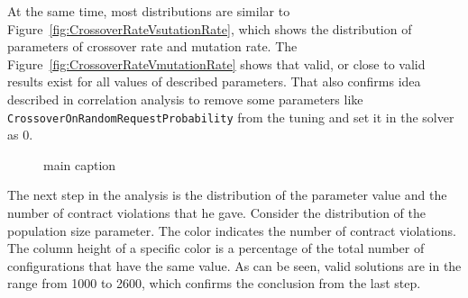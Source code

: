 At the same time, most distributions are similar to Figure~\ref{fig:CrossoverRateVsutationRate}, which shows the distribution of parameters of crossover rate and mutation rate. 
The Figure~\ref{fig:CrossoverRateVmutationRate} shows that valid, or close to valid results exist for all values of described parameters. That also confirms idea described in correlation analysis to remove some parameters like \texttt{CrossoverOnRandomRequestProbability} from the tuning and set it in the solver as 0.

\begin{figure}
	
	
	\caption{main caption}	
\end{figure}

The next step in the analysis is the distribution of the parameter value and the number of contract violations that he gave. Consider the distribution of the population size parameter.
The color indicates the number of contract violations. The column height of a specific color is a percentage of the total number of configurations that have the same value. As can be seen, valid solutions are in the range from 1000 to 2600, which confirms the conclusion from the last step.

